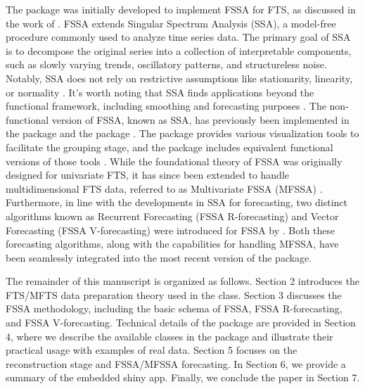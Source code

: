 The  package was initially developed to implement FSSA for FTS, as discussed in the work of \cite{haghbin2021}. FSSA extends Singular Spectrum Analysis (SSA), a model-free procedure commonly used to analyze time series data. The primary goal of SSA is to decompose the original series into a collection of interpretable components, such as slowly varying trends, oscillatory patterns, and structureless noise. Notably, SSA does not rely on restrictive assumptions like stationarity, linearity, or normality \citep{golyandina2013}. 
It's worth noting that SSA finds applications beyond the functional framework, including smoothing and forecasting purposes \citep{hassani2013, deCarvalho2017realtime}. The non-functional version of FSSA, known as SSA, has previously been implemented in the  package \citep{rssapackage} and the  package \citep{ASSApackage}.
The  package provides various visualization tools to facilitate the grouping stage, and the  package includes equivalent functional versions of those tools \citep{golyandina2018singular}. While the foundational theory of FSSA was originally designed for univariate FTS, it has since been extended to handle multidimensional FTS data, referred to as Multivariate FSSA (MFSSA) \citep{trinka2022multivariate}. Furthermore, in line with the developments in SSA for forecasting, two distinct algorithms known as Recurrent Forecasting (FSSA R-forecasting) and Vector Forecasting (FSSA V-forecasting) were introduced for FSSA by \cite{trinka2023functional}. Both these forecasting algorithms, along with the capabilities for handling MFSSA, have been seamlessly integrated into the most recent version of the  package. 

The remainder of this manuscript is organized as follows. Section 2 introduces the FTS/MFTS data preparation theory used in the  class. Section 3 discusses the FSSA methodology, including the basic schema of FSSA, FSSA R-forecasting, and FSSA V-forecasting. Technical details of the  package are provided in Section 4, where we describe the available classes in the package and illustrate their practical usage with examples of real data. Section 5 focuses on the reconstruction stage and FSSA/MFSSA forecasting. In Section 6, we provide a summary of the embedded shiny app. Finally, we conclude the paper in Section 7.


